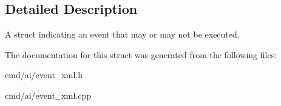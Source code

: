 \subsection{Detailed Description}
A struct indicating an event that may or may not be executed. 

The documentation for this struct was generated from the following files\+:\begin{DoxyCompactItemize}
\item 
cmd/ai/event\+\_\+xml.\+h\item 
cmd/ai/event\+\_\+xml.\+cpp\end{DoxyCompactItemize}
